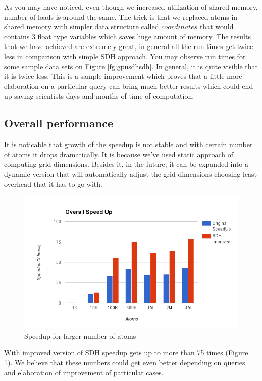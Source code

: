 \documentclass[11pt,a4paper]{report}
\begin{document}
As you may have noticed, even though we increased utilization of shared memory, number of loads is around the same. The trick is that we replaced atoms in shared memory with simpler data structure called $coordinates$ that would contains 3 float type variables which saves huge amount of memory. The results that we have achieved are extremely great, in general all the run times get twice less in comparison with simple SDH approach. You may observe run times for some sample data sets on Figure \ref{fg:gpusdhsdh}. In general, it is quite visible that it is twice less. 
This is a sample improvement which proves that a little more elaboration on a particular query can bring much better results which could end up saving scientists days and months of time of computation.


\subsection{Overall performance}

It is noticable that growth of the speedup is not stable and with certain number of atoms it drops dramatically. It is because we've used static approach of computing grid dimensions. Besides it, in the future, it can be expanded into a dynamic version that will automatically adjust the grid dimensions choosing least overhead that it has to go with.

\begin{figure}
 \centerline{\includegraphics[width=0.8\columnwidth]{images/overall_speedup}}
 \caption{Speedup for larger number of atoms}
 \label{fg:chart_max}
\end{figure}

With improved version of SDH speedup gets up to more than 75 times (Figure \ref{fg:chart_max}). We believe that these numbers could get even better depending on queries and elaboration of improvement of particular cases.
\end{document}
